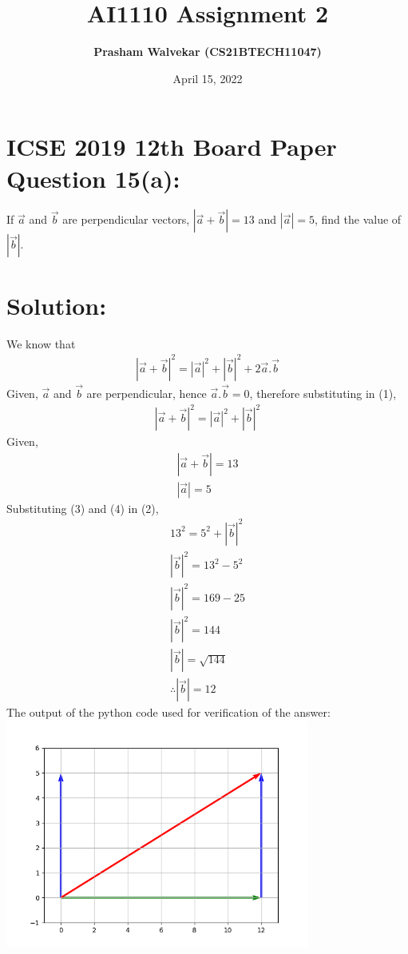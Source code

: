 \documentclass[journal, 12pt, twocolumn]{article}
\title{\Huge{\textbf{AI1110 Assignment 2}}}
\author{\large{\textbf{Prasham Walvekar (CS21BTECH11047)}}}
\date{April 15, 2022}
\begin{document}
\maketitle

\section*{\large{ICSE 2019 12th Board Paper Question 15(a):}}
\large{If \(\vec{a}\) and \(\vec{b}\) are perpendicular vectors, $\left| \vec{a}+\vec{b} \right| = 13 $ and $\left| \vec{a} \right| = 5$, find the value of $\left| \vec{b} \right|$.}
\section*{\large{Solution:}}
We know that
\begin{align}
\left| \vec{a}+\vec{b} \right|^2 = \left| \vec{a} \right|^2 + \left| \vec{b} \right|^2 + 2 \vec{a}.\vec{b}
\end{align}
Given, $\vec{a}$ and $\vec{b}$ are perpendicular, hence $\vec{a}.\vec{b}=0$, therefore substituting in (1),
\begin{align}
\left| \vec{a}+\vec{b} \right|^2 = \left| \vec{a} \right|^2 + \left| \vec{b} \right|^2
\end{align}
Given,
\begin{align}
\left| \vec{a}+\vec{b} \right| = 13\\
\left| \vec{a} \right| = 5
\end{align}
Substituting (3) and (4) in (2),
\begin{align}
13^2 = 5^2 + \left| \vec{b} \right|^2\\
\left| \vec{b} \right|^2 = 13^2 - 5^2\\
\left| \vec{b} \right|^2 = 169 - 25\\ 
\left| \vec{b} \right|^2 = 144\\
\left| \vec{b} \right| = \sqrt{144}\\
\therefore \left| \vec{b} \right| = 12
\end{align}
The output of the python code used for verification of the answer:\\
\includegraphics[width=100mm, scale=0.8]{vector_diagram.png}
\end{document}
